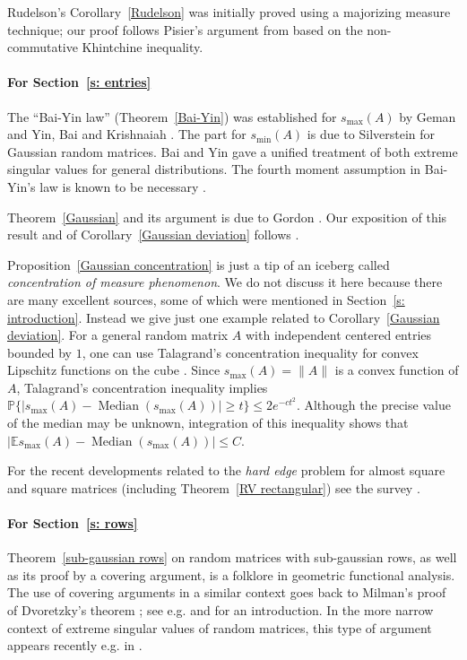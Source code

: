 \documentclass[10pt, openany]{book}
\theoremstyle{remark}
\DeclareMathOperator{\Median}{Median}
\def \E {\mathbb{E}}
\def \P {\mathbb{P}}
\def \smin {s_{\min}}
\def \smax {s_{\max}}
\begin{document}
Rudelson's Corollary~\ref{Rudelson} was initially proved using a majorizing measure
technique; our proof follows Pisier's argument from \cite{Rudelson isotropic}
based on the non-commutative Khintchine inequality. 


\paragraph{For Section~\ref{s: entries}}

The ``Bai-Yin law'' (Theorem~\ref{Bai-Yin}) was established for $\smax(A)$ by Geman \cite{Geman}
and Yin, Bai and Krishnaiah \cite{YBK}. 
The part for $\smin(A)$ is due to Silverstein \cite{Silverstein} for Gaussian random matrices.
Bai and Yin \cite{Bai-Yin} gave a unified treatment of both extreme singular values for general distributions.
The fourth moment assumption in Bai-Yin's law is known to be necessary \cite{Bai-Silverstein-Yin}.

Theorem~\ref{Gaussian} and its argument is due to Gordon \cite{Gordon 84, Gordon 85, Gordon 92}.
Our exposition of this result and of Corollary~\ref{Gaussian deviation} follows \cite{DS}.

Proposition~\ref{Gaussian concentration} is just a tip of an iceberg called {\em concentration of measure 
phenomenon}. 
We do not discuss it here because there are many excellent sources, some of which
were mentioned in Section~\ref{s: introduction}. Instead we give just one example related 
to Corollary~\ref{Gaussian deviation}.  
For a general random matrix $A$ with independent centered entries bounded by $1$,
one can use Talagrand's concentration inequality for convex
Lipschitz functions on the cube \cite{Tal1, Tal2}. 
Since $\smax(A)= \|A\|$ is a convex function of
$A$, Talagrand's concentration inequality implies
$\P \big\{ |\smax(A) - \Median(\smax(A))| \ge t \big\} \le 2 e^{-ct^2}$.
Although the precise value of the median may be unknown,
integration of this inequality shows
that $|\E \smax(A)-\Median(\smax(A))| \le C$.

For the recent developments related to the {\em hard edge} problem 
for almost square and square matrices (including Theorem~\ref{RV rectangular})
see the survey \cite{RV ICM}.


\paragraph{For Section~\ref{s: rows}}

Theorem~\ref{sub-gaussian rows} on random matrices with sub-gaussian rows,
as well as its proof by a covering argument, is a folklore in geometric functional analysis. 
The use of covering arguments in a similar context goes back to Milman's proof of Dvoretzky's theorem 
\cite{Milman Dvoretzky}; see e.g. \cite{Ball} and \cite[Chapter 4]{Pisier volume} for an introduction. 
In the more narrow context of extreme singular values of random matrices, 
this type of argument appears recently e.g. in \cite{ALPT}.
\end{document}
